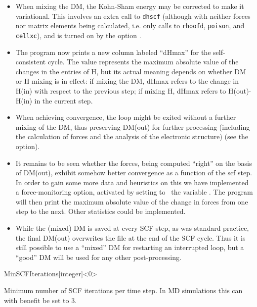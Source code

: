 \begin{itemize}
\item When mixing the DM, the Kohn-Sham energy may be corrected to make it
  variational. This involves an extra call to \texttt{dhscf} (although
  with neither forces nor matrix elements being calculated, i.e. only
  calls to \texttt{rhoofd}, \texttt{poison}, and \texttt{cellxc}), and is
  turned on by the option .


\item The program now prints a new column labeled ``dHmax'' for the
  self-consistent cycle. The value represents the maximum absolute
  value of the changes in the entries of H, but its actual meaning
  depends on whether DM or H mixing is in effect: if mixing the DM,
  dHmax refers to the change in H(in) with respect to the previous
  step; if mixing H, dHmax refers to H(out)-H(in) in the current
  step.

  \item When achieving convergence, the loop might be exited without a
  further mixing of the DM, thus preserving DM(out) for further
  processing (including the calculation of forces and the analysis of
  the electronic structure) (see the 
  option).


  \item It remains to be seen whether the forces, being computed
  ``right'' on the basis of DM(out), exhibit somehow better
  convergence as a function of the scf step. In order to gain some
  more data and heuristics on this we have implemented a
  force-monitoring option, activated by setting to \fdftrue\ the
  variable . The program will then print the
  maximum absolute value of the change in forces from one step to the
  next. Other statistics could be implemented.

  \item While the (mixed) DM is saved at every SCF step, as was
  standard practice, the final DM(out) overwrites the 
  file at the end of the SCF cycle. Thus it is still possible to use a
  ``mixed'' DM for restarting an interrupted loop, but a ``good'' DM
  will be used for any other post-processing.


\end{itemize}


\begin{fdfentry}{MinSCFIterations}[integer]<0>

  Minimum number of SCF iterations per time step. In MD
  simulations this can with benefit be set to 3.
  
\end{fdfentry}

